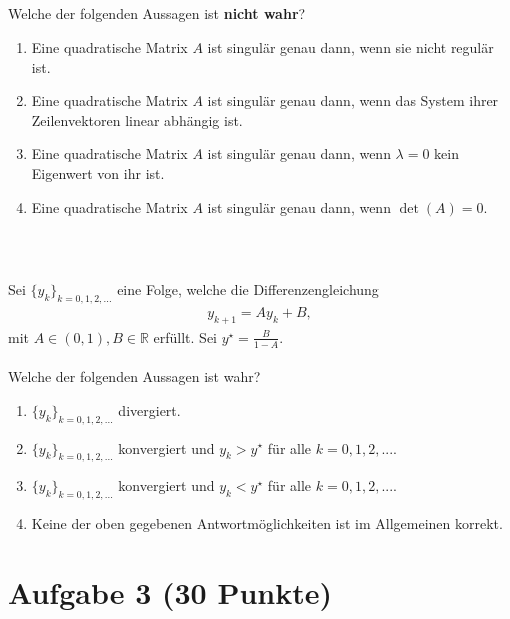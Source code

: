 \subsection*{}
Welche der folgenden Aussagen ist \textbf{nicht wahr}?
\renewcommand{\labelenumi}{(\alph{enumi})}
\begin{enumerate}
	\item 
	Eine quadratische Matrix $ A $ ist singulär genau dann, wenn sie nicht regulär ist.
	\item
	Eine quadratische Matrix $ A $ ist singulär genau dann, wenn das System ihrer Zeilenvektoren linear abhängig ist.
	
	\item
	Eine quadratische Matrix $ A $ ist singulär genau dann, wenn $ \lambda = 0 $ kein Eigenwert von ihr ist.
	
	\item
	Eine quadratische Matrix $ A $ ist singulär genau dann, wenn $\det(A) = 0 $.
\end{enumerate}
\ \\
\subsection*{}
Sei $ \{y_k\}_{k=0,1,2,...} $ eine Folge, welche die Differenzengleichung
\begin{align*}
	y_{k+1} = A y_k + B,
\end{align*}
mit $ A \in (0,1), B\in \mathbb{R} $ erfüllt. Sei $ y^\star = \frac{B}{1-A} $.\\
\\
Welche der folgenden Aussagen ist wahr?
\renewcommand{\labelenumi}{(\alph{enumi})}
\begin{enumerate}
	\item 
	$ \{y_k\}_{k=0,1,2,...}$ divergiert.
	\item
	$ \{y_k\}_{k=0,1,2,...}$ konvergiert und $ y_k > y^\star  $ für alle $ k = 0,1,2,... $.
	
	\item
	$ \{y_k\}_{k=0,1,2,...}$ konvergiert und $ y_k <y^\star  $ für alle $ k = 0,1,2,... $.
	\item
	Keine der oben gegebenen Antwortmöglichkeiten ist im Allgemeinen korrekt.
	
\end{enumerate}
\newpage
\section*{Aufgabe 3 (30 Punkte)}
\vspace{0.4cm}


